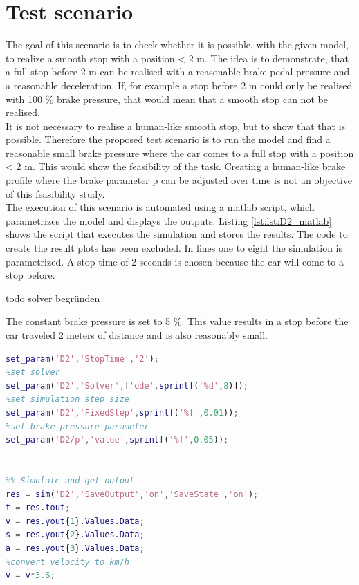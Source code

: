 \section{Test scenario}\label{sec:D2_scenario}
The goal of this scenario is to check whether it is possible, with the given model, to realize a smooth stop with a position < 2 m.
The idea is to demonstrate, that a full stop before 2 m can be realised with a reasonable brake pedal pressure and a reasonable deceleration.
If, for example a stop before 2 m could only be realised with 100 \% brake pressure, that would mean that a smooth stop can not be realised.\\
It is not necessary to realise a human-like smooth stop, but to show that that is possible.
Therefore the proposed test scenario is to run the model and find a reasonable small brake pressure where the car comes to a full stop with a position < 2 m.
This would show the feasibility of the task.
Creating a human-like brake profile where the brake parameter p can be adjusted over time is not an objective of this feasibility study.\\
The execution of this scenario is automated using a matlab script, which parametrizes the model and displays the outputs.
Listing \ref{lst:lst:D2_matlab} shows the script that executes the simulation and stores the results.
The code to create the result plots has been excluded.
In lines one to eight the simulation is parametrized.
A stop time of 2 seconds is chosen because the car will come to a stop before.

todo solver begründen

The constant brake pressure is set to 5 \%.
This value results in a stop before the car traveled 2 meters of distance and is also reasonably small.

\begin{lstlisting}[language=Matlab,basicstyle=\scriptsize, caption= Execution of the feasibility test,label= lst:D2_matlab]
%% Parametrize Model
set_param('D2','StopTime','2');
%set solver
set_param('D2','Solver',['ode',sprintf('%d',8)]);
%set simulation step size
set_param('D2','FixedStep',sprintf('%f',0.01));
%set brake pressure parameter
set_param('D2/p','value',sprintf('%f',0.05));


%% Simulate and get output
res = sim('D2','SaveOutput','on','SaveState','on');
t = res.tout;
v = res.yout{1}.Values.Data;
s = res.yout{2}.Values.Data;
a = res.yout{3}.Values.Data;
%convert velocity to km/h
v = v*3.6;
\end{lstlisting}
